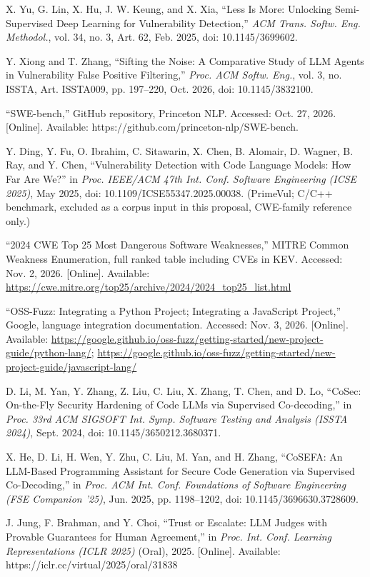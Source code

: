 \documentclass[11pt]{article}
\begin{document}
\begin{enumerate}[leftmargin=2.2em, itemsep=0.3ex, topsep=2pt, label={[\arabic*]}]
\item X. Yu, G. Lin, X. Hu, J. W. Keung, and X. Xia, ``Less Is More: Unlocking Semi-Supervised Deep Learning for Vulnerability Detection,'' \emph{ACM Trans. Softw. Eng. Methodol.}, vol. 34, no. 3, Art. 62, Feb. 2025, doi: 10.1145/3699602.
\item Y. Xiong and T. Zhang, ``Sifting the Noise: A Comparative Study of LLM Agents in Vulnerability False Positive Filtering,'' \emph{Proc. ACM Softw. Eng.}, vol. 3, no. ISSTA, Art. ISSTA009, pp. 197--220, Oct. 2026, doi: 10.1145/3832100.
\item ``SWE-bench,'' GitHub repository, Princeton NLP. Accessed: Oct. 27, 2026. [Online]. Available: https://github.com/princeton-nlp/SWE-bench.
\item Y. Ding, Y. Fu, O. Ibrahim, C. Sitawarin, X. Chen, B. Alomair, D. Wagner, B. Ray, and Y. Chen, ``Vulnerability Detection with Code Language Models: How Far Are We?'' in \emph{Proc. IEEE/ACM 47th Int. Conf. Software Engineering (ICSE 2025)}, May 2025, doi: 10.1109/ICSE55347.2025.00038. (PrimeVul; C/C++ benchmark, excluded as a corpus input in this proposal, CWE-family reference only.)
\item ``2024 CWE Top 25 Most Dangerous Software Weaknesses,'' MITRE Common Weakness Enumeration, full ranked table including CVEs in KEV. Accessed: Nov. 2, 2026. [Online]. Available: \url{https://cwe.mitre.org/top25/archive/2024/2024_top25_list.html}
\item ``OSS-Fuzz: Integrating a Python Project; Integrating a JavaScript Project,'' Google, language integration documentation. Accessed: Nov. 3, 2026. [Online]. Available: \url{https://google.github.io/oss-fuzz/getting-started/new-project-guide/python-lang/}; \url{https://google.github.io/oss-fuzz/getting-started/new-project-guide/javascript-lang/}
\item D. Li, M. Yan, Y. Zhang, Z. Liu, C. Liu, X. Zhang, T. Chen, and D. Lo, ``CoSec: On-the-Fly Security Hardening of Code LLMs via Supervised Co-decoding,'' in \emph{Proc. 33rd ACM SIGSOFT Int. Symp. Software Testing and Analysis (ISSTA 2024)}, Sept. 2024, doi: 10.1145/3650212.3680371.
\item X. He, D. Li, H. Wen, Y. Zhu, C. Liu, M. Yan, and H. Zhang, ``CoSEFA: An LLM-Based Programming Assistant for Secure Code Generation via Supervised Co-Decoding,'' in \emph{Proc. ACM Int. Conf. Foundations of Software Engineering (FSE Companion '25)}, Jun. 2025, pp. 1198--1202, doi: 10.1145/3696630.3728609.
\item J. Jung, F. Brahman, and Y. Choi, ``Trust or Escalate: LLM Judges with Provable Guarantees for Human Agreement,'' in \emph{Proc. Int. Conf. Learning Representations (ICLR 2025)} (Oral), 2025. [Online]. Available: https://iclr.cc/virtual/2025/oral/31838

\end{enumerate}
\end{document}
